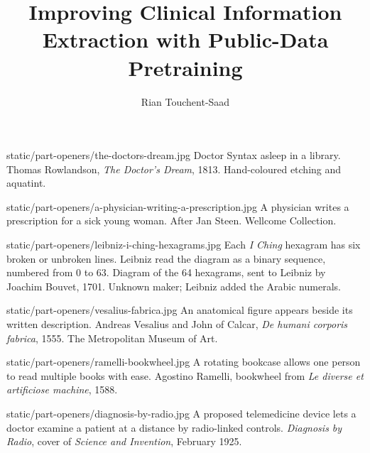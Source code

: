 \documentclass{mimosis}
\title{Improving Clinical Information Extraction with Public-Data Pretraining}
\author{Rian Touchent-Saad}
\begin{document}
\frontmatter



\tableofcontents

\mainmatter


%
  {static/part-openers/the-doctors-dream.jpg}%
  {\partplatecaption
    {Doctor Syntax asleep in a library.}
    {Thomas Rowlandson, \emph{The Doctor's Dream}, 1813.
     Hand-coloured etching and aquatint.}}
\label{part:intro}




%
  {static/part-openers/a-physician-writing-a-prescription.jpg}%
  {\partplatecaption
    {A physician writes a prescription for a sick young woman.}
    {After Jan Steen. Wellcome Collection.}}
\label{part:biomedtext}


%
  {static/part-openers/leibniz-i-ching-hexagrams.jpg}%
  {\partplatecaption
    {Each \emph{I Ching} hexagram has six broken or unbroken lines. Leibniz
     read the diagram as a binary sequence, numbered from 0 to 63.}
    {Diagram of the 64 hexagrams, sent to Leibniz by Joachim Bouvet, 1701.
     Unknown maker; Leibniz added the Arabic numerals.}}



%
  {static/part-openers/vesalius-fabrica.jpg}%
  {\partplatecaption
    {An anatomical figure appears beside its written description.}
    {Andreas Vesalius and John of Calcar,
     \emph{De humani corporis fabrica}, 1555.
     The Metropolitan Museum of Art.}}
\label{part:corpus}



%
  {static/part-openers/ramelli-bookwheel.jpg}%
  {\partplatecaption
    {A rotating bookcase allows one person to read multiple books with ease.}
    {Agostino Ramelli, bookwheel from
     \emph{Le diverse et artificiose machine}, 1588.}}
\label{part:pretraining}



%
  {static/part-openers/diagnosis-by-radio.jpg}%
  {\partplatecaption
    {A proposed telemedicine device lets a doctor examine a patient at a
     distance by radio-linked controls.}
    {\emph{Diagnosis by Radio}, cover of \emph{Science and Invention},
     February 1925.}}
\label{part:adaptation}

\end{document}
